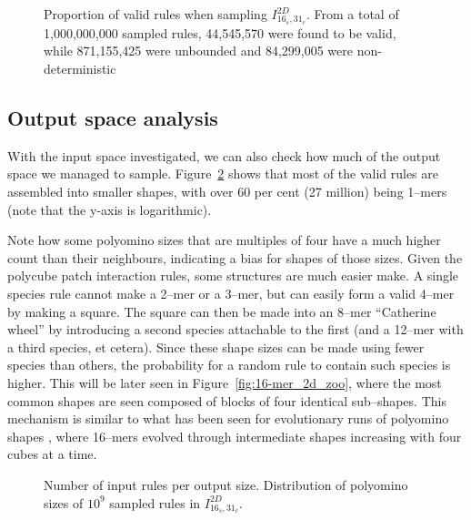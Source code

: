 \begin{figure}[h]
    \centering
    \caption{Proportion of valid rules when sampling \(I_{16_s,31_c}^{2D}\). From a total of 1,000,000,000 sampled rules, 44,545,570 were found to be valid, while 871,155,425 were  unbounded and 84,299,005 were non-deterministic}
    \label{fig:ref_validity}
\end{figure}

\subsection{Output space analysis}

With the input space investigated, we can also check how much of the output space we managed to sample. Figure~\ref{fig:ref_inputdistr} shows that most of the valid rules are assembled into smaller shapes, with over 60 per cent (27 million) being 1--mers (note that the y-axis is logarithmic).

Note how some polyomino sizes that are multiples of four have a much higher count than their neighbours, indicating a bias for shapes of those sizes. Given the polycube patch interaction rules, some structures are much easier make. A single species rule cannot make a 2--mer or a 3--mer, but can easily form a valid 4--mer by making a square. The square can then be made into an 8--mer ``Catherine wheel'' by introducing a second species attachable to the first (and a 12--mer with a third species, et cetera). Since these shape sizes can be made using fewer species than others, the probability for a random rule to contain such species is higher. This will be later seen in Figure~\ref{fig:16-mer_2d_zoo}, where the most common shapes are seen composed of blocks of four identical sub--shapes. This mechanism is similar to what has been seen for evolutionary runs of polyomino shapes \cite{johnston2011evolutionary}, where 16--mers evolved through intermediate shapes increasing with four cubes at a time.

\begin{figure}[h]
    \centering
    \caption{Number of input rules per output size. Distribution of polyomino sizes of \(10^9\) sampled rules in \(I_{16_s,31_c}^{2D}\).
    }
    \label{fig:ref_inputdistr}
\end{figure}

